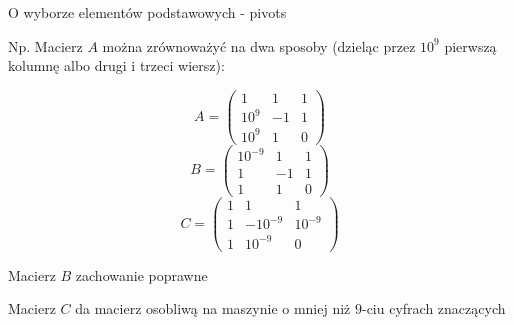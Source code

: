 \begin{frame}{ O wyborze elementów podstawowych - pivots}

Np. Macierz $A$ można zrównoważyć na dwa sposoby (dzieląc przez $10^9$ pierwszą kolumnę albo drugi i trzeci wiersz):

$$A=\left(\begin{array}{lll}
1 & 1 & 1\\
10^{9} & -1 & 1\\
10^{9} & 1 & 0
\end{array}\right)
$$
$$
B=\left(\begin{array}{lll}
10^{-9} & 1 & 1\\
1 & -1 & 1\\
1 & 1 & 0
\end{array}\right)
$$
$$
C=\left(\begin{array}{lll}
1 & 1 & 1\\
1 & -10^{-9} & 10^{-9}\\
1 & 10^{-9} & 0
\end{array}\right)
$$

Macierz $B$ zachowanie poprawne

Macierz $C$ da macierz osobliwą na maszynie o mniej niż $ 9$-ciu cyfrach znaczących

\end{frame}

